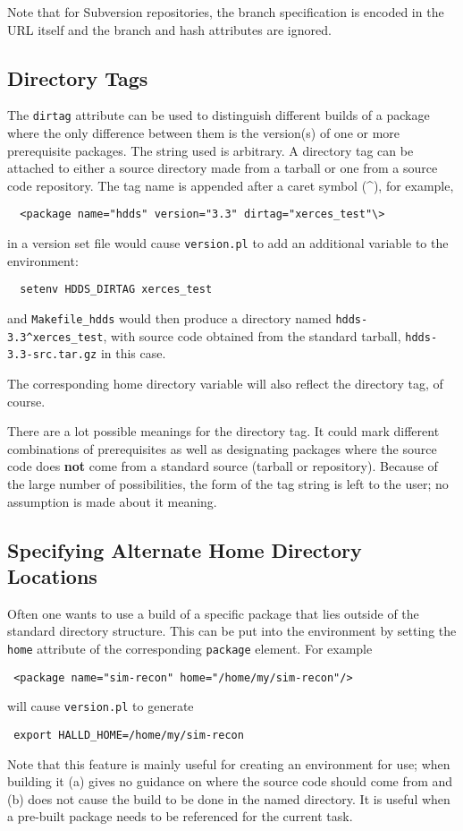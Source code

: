\documentclass[12pt]{article}
\begin{document}
Note that for Subversion repositories, the branch specification is
encoded in the URL itself and the branch and hash attributes are ignored.

\subsection{Directory Tags}\label{section:directory-tags}

The {\tt dirtag} attribute can be used to distinguish different builds
of a package where the only difference between them is the version(s)
of one or more prerequisite packages. The string used is arbitrary. A
directory tag can be attached to either a source directory made from a
tarball or one from a source code repository. The tag name is appended
after a caret symbol (\^{}), for example,
\begin{verbatim}
  <package name="hdds" version="3.3" dirtag="xerces_test"\>
\end{verbatim}
in a version set file would cause {\tt version.pl} to add an additional
variable to the environment:
\begin{verbatim}
  setenv HDDS_DIRTAG xerces_test
\end{verbatim}
and {\tt Makefile\_hdds} would then produce a directory named
{\tt hdds-3.3\^{}xerces\_test}, with source code obtained from the standard
tarball, {\tt hdds-3.3-src.tar.gz} in this case.

The corresponding home directory variable will also reflect the
directory tag, of course.

There are a lot possible meanings for the directory tag. It could mark
different combinations of prerequisites as well as designating
packages where the source code does {\bf not} come from a standard
source (tarball or repository). Because of the large number of
possibilities, the form of the tag string is left to the user; no
assumption is made about it meaning.

\subsection{Specifying Alternate Home Directory Locations}

Often one wants to use a build of a specific package that lies outside
of the standard directory structure. This can be put into the
environment by setting the {\tt home} attribute of the corresponding
{\tt package} element. For example
\begin{center} \tt
<package name="sim-recon" home="/home/my/sim-recon"/>
\end{center}
will cause {\tt version.pl} to generate
\begin{center} \tt
export HALLD\_HOME=/home/my/sim-recon
\end{center}
Note that this feature is mainly useful for creating an environment
for use; when building it (a) gives no guidance on where the source
code should come from and (b) does not cause the build to be done in
the named directory. It is useful when a pre-built package needs to be
referenced for the current task.
\end{document}

